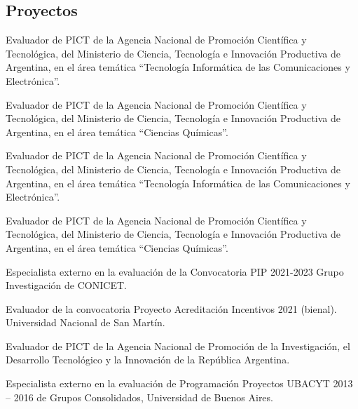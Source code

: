 \subsection{Proyectos}

 Evaluador de PICT de la Agencia Nacional de Promoción Científica y Tecnológica, del Ministerio de Ciencia, Tecnología e Innovación Productiva de Argentina, en el área temática ``Tecnología Informática de las Comunicaciones y Electrónica''.

 Evaluador de PICT de la Agencia Nacional de Promoción Científica y Tecnológica, del Ministerio de Ciencia, Tecnología e 
Innovación Productiva de Argentina, en el área temática ``Ciencias Químicas''.

 Evaluador de PICT de la Agencia Nacional de Promoción Científica y Tecnológica, del Ministerio de Ciencia, Tecnología e 
Innovación Productiva de Argentina, en el área temática ``Tecnología Informática de las Comunicaciones y Electrónica''.

 Evaluador de PICT de la Agencia Nacional de Promoción Científica y Tecnológica, del Ministerio de Ciencia, Tecnología e 
Innovación Productiva de Argentina, en el área temática ``Ciencias Químicas''.

 Especialista externo en la evaluación de la Convocatoria PIP 2021-2023 Grupo Investigación de CONICET.

 Evaluador de la convocatoria Proyecto Acreditación Incentivos 2021 (bienal). Universidad Nacional de San Martín.

 Evaluador de PICT de la Agencia Nacional de Promoción de la Investigación, el Desarrollo Tecnológico y la Innovación de la República Argentina.

 Especialista externo en la evaluación de Programación Proyectos UBACYT 2013 -- 2016 de Grupos Consolidados, Universidad de Buenos Aires.

